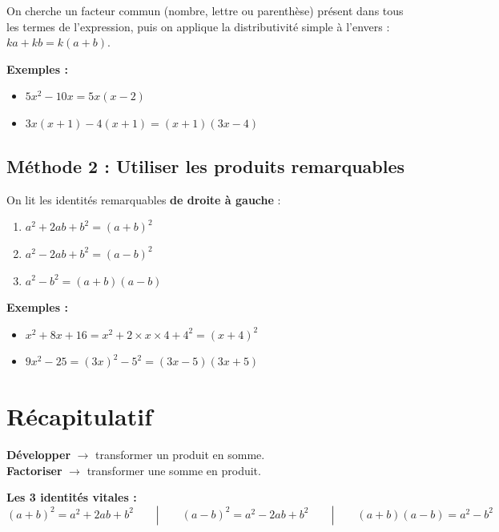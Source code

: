 \documentclass[11pt,a4paper]{article}
\begin{document}
\begin{methode}
On cherche un facteur commun (nombre, lettre ou parenthèse) présent dans tous les termes de l'expression, puis on applique la distributivité simple à l'envers : $ka + kb = k(a + b)$.
\end{methode}

\textbf{Exemples :}
\begin{itemize}
  \item $5x^2 - 10x = 5x(x - 2)$
  \item $3x(x+1) - 4(x+1) = (x+1)(3x - 4)$
\end{itemize}

\subsection{Méthode 2 : Utiliser les produits remarquables}

On lit les identités remarquables \textbf{de droite à gauche} :
\begin{enumerate}
  \item $a^2 + 2ab + b^2 = (a + b)^2$
  \item $a^2 - 2ab + b^2 = (a - b)^2$
  \item $a^2 - b^2 = (a + b)(a - b)$
\end{enumerate}

\textbf{Exemples :}
\begin{itemize}
  \item $x^2 + 8x + 16 = x^2 + 2 \times x \times 4 + 4^2 = (x + 4)^2$
  \item $9x^2 - 25 = (3x)^2 - 5^2 = (3x - 5)(3x + 5)$
\end{itemize}

\section{Récapitulatif}

\begin{tcolorbox}[colback=gray!6,colframe=gray!60!black,title={\bfseries À retenir}]
\textbf{Développer} $\rightarrow$ transformer un produit en somme.\\
\textbf{Factoriser} $\rightarrow$ transformer une somme en produit.

\textbf{Les 3 identités vitales :}
\[
(a+b)^2 = a^2 + 2ab + b^2 \qquad | \qquad (a-b)^2 = a^2 - 2ab + b^2 \qquad | \qquad (a+b)(a-b) = a^2 - b^2
\]
\end{tcolorbox}
\end{document}
